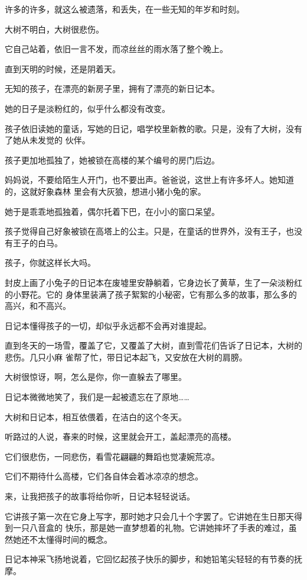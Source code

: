 \documentclass[12pt,a4paper]{article}
\begin{document}
		许多的许多，就这么被遗落，和丢失，在一些无知的年岁和时刻。


		大树不明白，大树很悲伤。

		它自己站着，依旧一言不发，而凉丝丝的雨水落了整个晚上。

		直到天明的时候，还是阴着天。


		无知的孩子，在漂亮的新房子里，拥有了漂亮的新日记本。

		她的日子是淡粉红的，似乎什么都没有改变。

		孩子依旧读她的童话，写她的日记，唱学校里新教的歌。只是，没有了大树，没有了她从未发觉的
	伙伴。


		孩子更加地孤独了，她被锁在高楼的某个编号的房门后边。

		妈妈说，不要给陌生人开门，也不要出声。爸爸说，这世上有许多坏人。她知道的，这就好象森林
	里会有大灰狼，想进小猪小兔的家。

		她于是乖乖地孤独着，偶尔托着下巴，在小小的窗口呆望。

		孩子觉得自己好象被锁在高塔上的公主。只是，在童话的世界外，没有王子，也没有王子的白马。


		孩子，你就这样长大吗。

		封皮上画了小兔子的日记本在废墟里安静躺着，它身边长了黄草，生了一朵淡粉红的小野花。它的
	身体里装满了孩子絮絮的小秘密，它有那么多的故事，那么多的高兴，和不高兴。

		日记本懂得孩子的一切，却似乎永远都不会再对谁提起。

		直到冬天的一场雪，覆盖了它，又覆盖了大树，直到雪花们告诉了日记本，大树的悲伤。几只小麻
	雀帮了忙，带日记本起飞，又安放在大树的肩膀。

		大树很惊讶，啊，怎么是你，你一直躲去了哪里。

		日记本微微地笑了，我们是一起被遗忘在了原地……

		大树和日记本，相互依偎着，在洁白的这个冬天。

		听路过的人说，春来的时候，这里就会开工，盖起漂亮的高楼。


		它们很悲伤，一同悲伤，看雪花翩翩的舞蹈也觉凄婉荒凉。

		它们不期待什么高楼，它们各自体会着冰凉凉的想念。


		来，让我把孩子的故事将给你听，日记本轻轻说话。

		它讲孩子第一次在它身上写字，那时她才只会几十个字罢了。它讲她在生日那天得到一只八音盒的
	快乐，那是她一直梦想着的礼物。它讲她摔坏了手表的难过，虽然她还不太懂得时间的概念。

		日记本神采飞扬地说着，它回忆起孩子快乐的脚步，和她铅笔尖轻轻的有节奏的抚摩。
\end{document}

